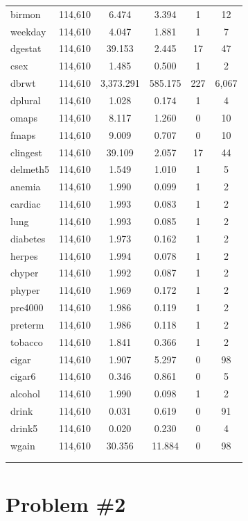 \documentclass[a4paper, 12pt]{article}
\begin{document}
\begin{table}[!htbp]
\begin{tabular}{@{\extracolsep{5pt}}lccccc}
birmon & 114,610 & 6.474 & 3.394 & 1 & 12 \\ 
weekday & 114,610 & 4.047 & 1.881 & 1 & 7 \\ 
dgestat & 114,610 & 39.153 & 2.445 & 17 & 47 \\ 
csex & 114,610 & 1.485 & 0.500 & 1 & 2 \\ 
dbrwt & 114,610 & 3,373.291 & 585.175 & 227 & 6,067 \\ 
dplural & 114,610 & 1.028 & 0.174 & 1 & 4 \\ 
omaps & 114,610 & 8.117 & 1.260 & 0 & 10 \\ 
fmaps & 114,610 & 9.009 & 0.707 & 0 & 10 \\ 
clingest & 114,610 & 39.109 & 2.057 & 17 & 44 \\ 
delmeth5 & 114,610 & 1.549 & 1.010 & 1 & 5 \\ 
anemia & 114,610 & 1.990 & 0.099 & 1 & 2 \\ 
cardiac & 114,610 & 1.993 & 0.083 & 1 & 2 \\ 
lung & 114,610 & 1.993 & 0.085 & 1 & 2 \\ 
diabetes & 114,610 & 1.973 & 0.162 & 1 & 2 \\ 
herpes & 114,610 & 1.994 & 0.078 & 1 & 2 \\ 
chyper & 114,610 & 1.992 & 0.087 & 1 & 2 \\ 
phyper & 114,610 & 1.969 & 0.172 & 1 & 2 \\ 
pre4000 & 114,610 & 1.986 & 0.119 & 1 & 2 \\ 
preterm & 114,610 & 1.986 & 0.118 & 1 & 2 \\ 
tobacco & 114,610 & 1.841 & 0.366 & 1 & 2 \\ 
cigar & 114,610 & 1.907 & 5.297 & 0 & 98 \\ 
cigar6 & 114,610 & 0.346 & 0.861 & 0 & 5 \\ 
alcohol & 114,610 & 1.990 & 0.098 & 1 & 2 \\ 
drink & 114,610 & 0.031 & 0.619 & 0 & 91 \\ 
drink5 & 114,610 & 0.020 & 0.230 & 0 & 4 \\ 
wgain & 114,610 & 30.356 & 11.884 & 0 & 98 \\ 
\hline \\[-1.8ex] 
\normalsize 
\end{tabular} 
\end{table} 


\section{Problem \#2}
\end{document}
